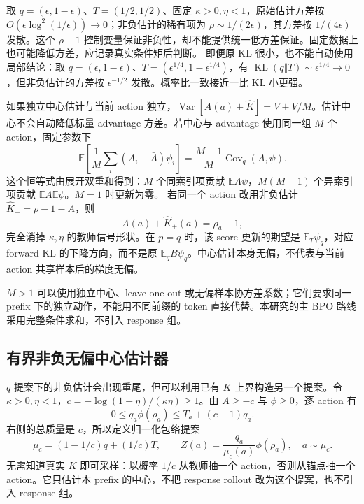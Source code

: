 \documentclass[lang=cn,scheme=chinese,openany]{../book/elegantbook}
\newcommand{\E}{\mathbb E}
\newcommand{\KL}{\operatorname{KL}}
\newcommand{\Var}{\operatorname{Var}}
\begin{document}
取 $q=(\epsilon,1-\epsilon)$、$T=(1/2,1/2)$、固定 $\kappa>0,\eta<1$，原始估计方差按 $O(\epsilon\log^2(1/\epsilon))\to0$；非负估计的稀有项为 $\rho\sim1/(2\epsilon)$，其方差按 $1/(4\epsilon)$ 发散。这个 $\rho-1$ 控制变量保证非负性，却不能提供统一低方差保证。固定数据上也可能降低方差，应记录真实条件矩后判断。 即便原 KL 很小，也不能自动使用局部结论：取 $q=(\epsilon,1-\epsilon)$、$T=(\epsilon^{1/4},1-\epsilon^{1/4})$，有 $\KL(q\Vert T)\sim\epsilon^{1/4}\to0$，但非负估计的方差按 $\epsilon^{-1/2}$ 发散。概率比一致接近一比 KL 小更强。

如果独立中心估计与当前 action 独立，$\Var[A(a)+\widehat K]=V+V/M$。估计中心不会自动降低标量 advantage 方差。若中心与 advantage 使用同一组 $M$ 个 action，固定参数下
\begin{equation}
 \E\left[\frac1M\sum_i(A_i-\bar A)\psi_i\right]
 =\frac{M-1}{M}\operatorname{Cov}_q(A,\psi).
\end{equation}
这个恒等式由展开双重和得到：$M$ 个同索引项贡献 $\E A\psi$，$M(M-1)$ 个异索引项贡献 $\E A\E\psi$。$M=1$ 时更新为零。 若同一个 action 改用非负估计 $\widehat K_+=\rho-1-A$，则
\begin{equation}
 A(a)+\widehat K_+(a)=\rho_a-1,
\end{equation}
完全消掉 $\kappa,\eta$ 的教师信号形状。在 $p=q$ 时，该 score 更新的期望是 $\E_T\psi_q$，对应 forward-KL 的下降方向，而不是原 $\E_qB\psi_q$。中心估计本身无偏，不代表与当前 action 共享样本后的梯度无偏。

$M>1$ 可以使用独立中心、leave-one-out 或无偏样本协方差系数；它们要求同一 prefix 下的独立动作，不能用不同前缀的 token 直接代替。本研究的主 BPO 路线采用完整条件求和，不引入 response 组。
\subsection{有界非负无偏中心估计器}

$q$ 提案下的非负估计会出现重尾，但可以利用已有 $K$ 上界构造另一个提案。令 $\kappa>0,\eta<1$，$c=-\log(1-\eta)/(\kappa\eta)\ge1$。由 $A\ge-c$ 与 $\phi\ge0$，逐 action 有
\begin{equation}
 0\le q_a\phi(\rho_a)\le T_a+(c-1)q_a.
\end{equation}
右侧的总质量是 $c$，所以定义归一化包络提案
\begin{equation}
 \mu_c=(1-1/c)q+(1/c)T,\qquad
 Z(a)=\frac{q_a}{\mu_c(a)}\phi(\rho_a),\quad a\sim\mu_c.
 \label{eq:center-bounded-mixture-estimator}
\end{equation}
无需知道真实 $K$ 即可采样：以概率 $1/c$ 从教师抽一个 action，否则从锚点抽一个 action。它只估计本 prefix 的中心，不把 response rollout 改为这个提案，也不引入 response 组。
\end{document}
